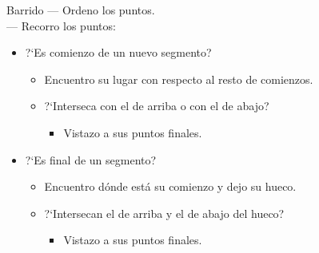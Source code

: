    \begin{frame}{Barrido}{}
    {\color{orange}---} Ordeno los puntos.\\
    {\color{orange}---} Recorro los puntos:
    \begin{itemize}
        \item ?`Es comienzo de un nuevo segmento?
        \begin{itemize}
        \item Encuentro su lugar con respecto al resto de comienzos.
        \item ?`Interseca con el de arriba o con el de abajo?
            \begin{itemize}
            \item Vistazo a sus puntos finales.
            \end{itemize}
        \end{itemize}
        \item ?`Es final de un segmento?
        \begin{itemize}
        \item Encuentro dónde está su comienzo y dejo su hueco.
        \item ?`Intersecan el de arriba y el de abajo del hueco?
            \begin{itemize}
            \item Vistazo a sus puntos finales.
            \end{itemize}
        \end{itemize}
    \end{itemize}
    \end{frame}
    

